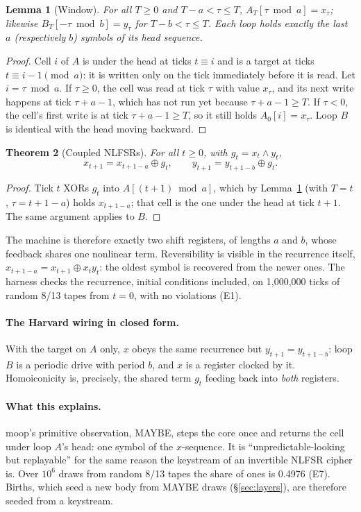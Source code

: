 \documentclass[11pt]{article}
\newtheorem{theorem}{Theorem}
\newtheorem{lemma}[theorem]{Lemma}
\theoremstyle{definition}
\theoremstyle{remark}
\newcommand{\moop}{\textsf{moop}}
\newcommand{\xor}{\oplus}
\begin{document}
\begin{lemma}[Window]
\label{lem:window}
For all $T\ge0$ and $T-a<\tau\le T$, $A_T[\tau\bmod a]=x_\tau$; likewise
$B_T[-\tau\bmod b]=y_\tau$ for $T-b<\tau\le T$. Each loop holds exactly
the last $a$ (respectively $b$) symbols of its head sequence.
\end{lemma}
\begin{proof}
Cell $i$ of $A$ is under the head at ticks $t\equiv i$ and is a target at
ticks $t\equiv i-1 \pmod a$: it is written only on the tick immediately
before it is read. Let $i=\tau\bmod a$. If $\tau\ge0$, the cell was read
at tick $\tau$ with value $x_\tau$, and its next write happens at tick
$\tau+a-1$, which has not run yet because $\tau+a-1\ge T$. If $\tau<0$,
the cell's first write is at tick $\tau+a-1\ge T$, so it still holds
$A_0[i]=x_\tau$. Loop $B$ is identical with the head moving backward.
\end{proof}

\begin{theorem}[Coupled NLFSRs]
\label{thm:closed}
For all $t\ge0$, with $g_t=x_t\wedge y_t$,
\[
x_{t+1}=x_{t+1-a}\xor g_t,\qquad y_{t+1}=y_{t+1-b}\xor g_t.
\]
\end{theorem}
\begin{proof}
Tick $t$ XORs $g_t$ into $A[(t+1)\bmod a]$, which by
Lemma~\ref{lem:window} (with $T=t$, $\tau=t+1-a$) holds $x_{t+1-a}$; that
cell is the one under the head at tick $t+1$. The same argument applies
to $B$.
\end{proof}

The machine is therefore exactly two shift registers, of lengths $a$ and
$b$, whose feedback shares one nonlinear term. Reversibility is visible
in the recurrence itself, $x_{t+1-a}=x_{t+1}\xor x_ty_t$: the oldest
symbol is recovered from the newer ones. The harness checks the
recurrence, initial conditions included, on 1,000,000 ticks of random
8/13 tapes from $t=0$, with no violations (E1).

\paragraph{The Harvard wiring in closed form.}
With the target on $A$ only, $x$ obeys the same recurrence but
$y_{t+1}=y_{t+1-b}$: loop $B$ is a periodic drive with period $b$, and
$x$ is a register clocked by it. Homoiconicity is, precisely, the shared
term $g_t$ feeding back into \emph{both} registers.

\paragraph{What this explains.}
\moop{}'s primitive observation, MAYBE, steps the core once and returns
the cell under loop $A$'s head: one symbol of the $x$-sequence. It is
``unpredictable-looking but replayable'' for the same reason the
keystream of an invertible NLFSR cipher is. Over $10^6$ draws from
random 8/13 tapes the share of ones is 0.4976 (E7). Births, which seed a
new body from MAYBE draws (\S\ref{sec:layers}), are therefore seeded
from a keystream.
\end{document}
